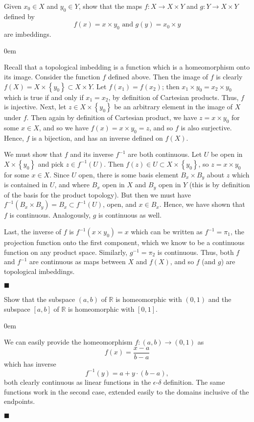 \documentclass[12pt]{article}
\renewcommand{\qed}{\hfill$\blacksquare$}
\renewenvironment{proof}{\begin{addmargin}[1em]{0em}\begin{newproof}}{\end{newproof}\end{addmargin}\qed}
\newenvironment{problem}[2][Exercise]{\begin{trivlist}
\item[\hskip \labelsep {\bfseries #1}\hskip \labelsep {\bfseries #2.}]}{\end{trivlist}}
\begin{document}
\begin{problem}{18.4}
Given $x_0 \in X$ and $y_0\in Y$, show that the maps $f:X\rightarrow X\times Y$ and $g:Y\rightarrow X\times Y$ defined by $$ f\left(x\right) = x\times y_0 \text{   and   } g\left(y\right) = x_0 \times y $$ are imbeddings.
\end{problem}
\begin{proof}
Recall that a topological imbedding is a function which is a homeomorphism onto its image. Consider the function $f$ defined above. Then the image of $f$ is clearly $f\left(X\right) = X \times \left\{y_0\right\} \subset X \times Y$. Let $f\left(x_1\right) = f\left(x_2\right)$; then $x_1 \times y_0 = x_2 \times y_0$ which is true if and only if $x_1 = x_2$, by definition of Cartesian products. Thus, $f$ is injective. Next, let $z \in X \times \left\{y_0\right\}$ be an arbitrary element in the image of $X$ under $f$. Then again by definition of Cartesian product, we have $z = x \times y_0$ for some $x \in X$, and so we have $f\left(x\right) = x\times y_0 = z$, and so $f$ is also surjective. Hence, $f$ is a bijection, and has an inverse defined on $f\left(X\right)$.

We must show that $f$ and its inverse $f^{-1}$ are both continuous. Let $U$ be open in $X\times \left\{y_0\right\}$ and pick $z \in f^{-1}\left(U\right)$. Then $f\left(z\right) \in U \subset X\times \left\{y_0\right\}$, so $z= x\times y_0$ for some $x\in X$. Since $U$ open, there is some basis element $B_x \times B_y$ about $z$ which is contained in $U$, and where $B_x$ open in $X$ and $B_y$ open in $Y$ (this is by definition of the basis for the product topology). But then we must have $f^{-1}\left(B_x \times B_y\right) = B_x \subset f^{-1}\left(U\right)$, open, and $x \in B_x$. Hence, we have shown that $f$ is continuous. Analogously, $g$ is continuous as well.

Last, the inverse of $f$ is $f^{-1}\left(x\times y_0\right) = x$ which can be written as $f^{-1} = \pi_1$, the projection function onto the first component, which we know to be a continuous function on any product space. Similarly, $g^{-1} = \pi_2$ is continuous. Thus, both $f$ and $f^{-1}$ are continuous as maps between $X$ and $f\left(X\right)$, and so $f$ (and $g$) are topological imbeddings.
\end{proof}



\begin{problem}{18.5}
Show that the subspace $\left(a,b\right)$ of $\mathbb{R}$ is homeomorphic with $\left(0,1\right)$ and the subspace $\left[a,b\right]$ of $\mathbb{R}$ is homeomorphic with $\left[0,1\right]$.
\end{problem}
\begin{proof}
	We can easily provide the homeomorphism $f:\left(a,b\right) \rightarrow \left(0,1\right)$ as $$ f\left(x\right) = \frac{x-a}{b-a} $$ which has inverse $$ f^{-1}\left(y\right) = a + y\cdot (b-a), $$ both clearly continuous as linear functions in the $\epsilon$-$\delta$ definition. The same functions work in the second case, extended easily to the domains inclusive of the endpoints.
\end{proof}
\end{document}
